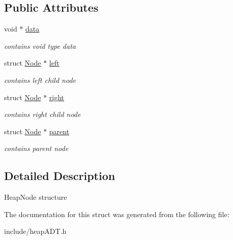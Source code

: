 \subsection*{Public Attributes}
\begin{DoxyCompactItemize}
\item 
\mbox{\label{structNode_a38b733496e3eff5e0b4fcb11cd9b866a}} 
void $\ast$ \hyperlink{structNode_a38b733496e3eff5e0b4fcb11cd9b866a}{data}
\begin{DoxyCompactList}\small\item\em contains void type data \end{DoxyCompactList}\item 
\mbox{\label{structNode_ad0976834843c7618677d22a10c495b36}} 
struct \hyperlink{structNode}{Node} $\ast$ \hyperlink{structNode_ad0976834843c7618677d22a10c495b36}{left}
\begin{DoxyCompactList}\small\item\em contains left child node \end{DoxyCompactList}\item 
\mbox{\label{structNode_af99e7102380da88d7c079fa264230cf4}} 
struct \hyperlink{structNode}{Node} $\ast$ \hyperlink{structNode_af99e7102380da88d7c079fa264230cf4}{right}
\begin{DoxyCompactList}\small\item\em contains right child node \end{DoxyCompactList}\item 
\mbox{\label{structNode_a34f3ab9670c7b70dad8905359a243c92}} 
struct \hyperlink{structNode}{Node} $\ast$ \hyperlink{structNode_a34f3ab9670c7b70dad8905359a243c92}{parent}
\begin{DoxyCompactList}\small\item\em contains parent node \end{DoxyCompactList}\end{DoxyCompactItemize}


\subsection{Detailed Description}
Heap\+Node structure 

The documentation for this struct was generated from the following file\+:\begin{DoxyCompactItemize}
\item 
include/heap\+A\+D\+T.\+h\end{DoxyCompactItemize}
